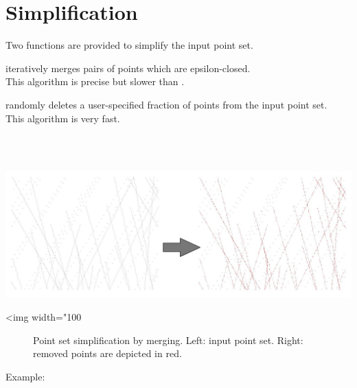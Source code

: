 \section{Simplification}

Two functions are provided to simplify the input point set.

 iteratively merges pairs of points which are epsilon-closed.\\
This algorithm is precise but slower than .

 randomly deletes a user-specified fraction of points from the input point set.\\
This algorithm is very fast.

  \\
  \\

\begin{center}
    \label{Point_set_processing_3-fig-merge_simplification}
    \begin{ccTexOnly}
        \includegraphics[width=1.0\textwidth]{Point_set_processing_3/merge_simplification} %
    \end{ccTexOnly}
    \begin{ccHtmlOnly}
        <img width="100%
    \end{ccHtmlOnly}
    \begin{figure}[h]
        \caption{Point set simplification by merging.
                 Left: input point set.
                 Right: removed points are depicted in red.}
    \end{figure}
\end{center}

Example:

